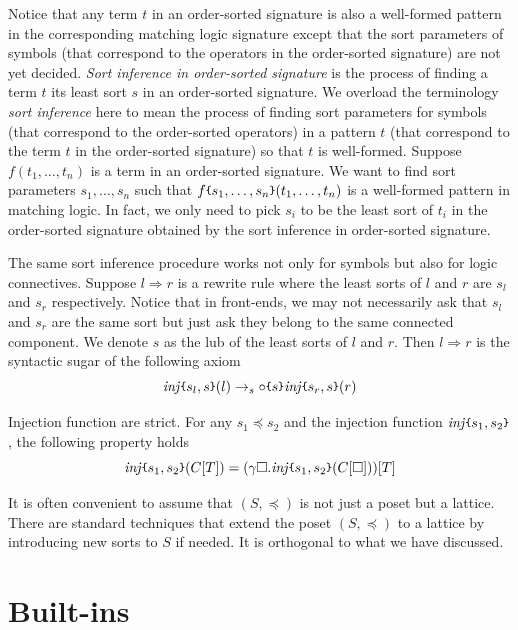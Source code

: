\documentclass[UTF8,11pt]{article}
\theoremstyle{plain}
\theoremstyle{definition}
\theoremstyle{remark}
\newcommand{\parametric}[2]{{#1}\raisebox{.2ex}{\texttt{\footnotesize{\{}}}#2\raisebox{.2ex}{\texttt{\footnotesize{\}}}}}
\newcommand{\inj}[2]{\parametric{\mathit{inj}}{#1, #2}}
\begin{document}
Notice that any term $t$ in an order-sorted signature is also a well-formed 
pattern in the corresponding matching logic signature except that the sort 
parameters of symbols (that correspond to the operators in the order-sorted 
signature) are not yet decided.
\emph{Sort inference in order-sorted signature} is the process of finding a 
term $t$ its least sort $s$ in an order-sorted signature.
We overload the terminology \emph{sort inference} here to 
mean the process of finding sort parameters for symbols (that correspond to 
the order-sorted operators) in a pattern $t$ (that correspond to the term $t$ 
in the order-sorted signature) so that $t$ is well-formed.
Suppose $f(t_1,\dots,t_n)$ is a term in an order-sorted signature.
We want to find sort parameters $s_1,\dots,s_n$ such that
$\parametric{f}{s_1,\dots,s_n}(t_1,\dots,t_n)$ is a well-formed pattern in 
matching logic.
In fact, we only need to pick $s_i$ to be the least sort of $t_i$ in the 
order-sorted signature obtained by the sort inference in order-sorted signature.

The same sort inference procedure works not only for symbols but also for logic 
connectives.
Suppose $l \Rightarrow r$ is a rewrite rule where the least sorts of $l$ and 
$r$ are $s_l$ and $s_r$ respectively.
Notice that in front-ends, we may not necessarily ask that $s_l$ and $s_r$ are 
the same sort but just ask they belong to the same connected component.
We denote $s$ as the lub of the least sorts of $l$ and $r$.
Then $l \Rightarrow r$ is the syntactic sugar of the following axiom
$$
\inj{s_l}{s}(l) \to_s \parametric{\circ}{s} \inj{s_r}{s}(r)
$$

Injection function are strict.
For any $s_1 \preceq s_2$ and the injection function $\inj{s_1}{s_2}$, the 
following property holds
$$
\inj{s_1}{s_2}(C[T]) = (\gamma \square . \inj{s_1}{s_2}(C[\square]))[T]
$$

It is often convenient to assume that $(S,\preceq)$ is not just a poset but a  
lattice.
There are standard techniques that extend the poset $(S,\preceq)$ to a lattice 
by introducing new sorts to $S$ if needed.
It is orthogonal to what we have discussed.



\section{Built-ins}
\label{sec:builtins}
\end{document}
